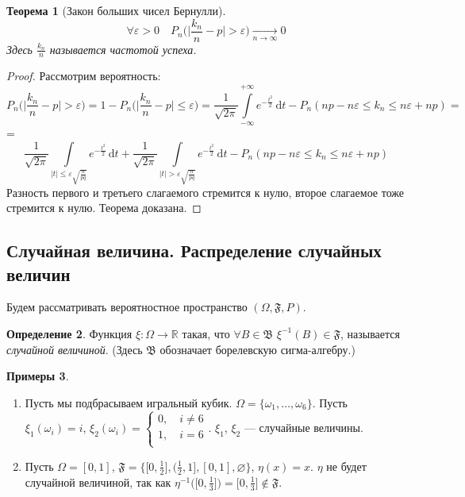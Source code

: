 \documentclass[11pt,openany,a4paper]{scrartcl}
\theoremstyle{plain}
\newtheorem{theorem}{Теорема}[subsection]
\theoremstyle{definition}
\newtheorem{definition}[theorem]{Определение}
\newtheorem{examples}[theorem]{Примеры}
\newcommand\mb{\mathbb}
\newcommand\real{\mb R}
\newcommand{\underto}[1]{\xrightarrow[#1]{}}
\newcommand{\dif}{\, \mathrm d}
\begin{document}
\begin{theorem}[Закон больших чисел Бернулли]\label{large_numbers_bernoulli}
    $$
    \forall \varepsilon > 0\quad P_n\bigg(\bigg|\frac{k_n}{n} -
    p\bigg| > \varepsilon\bigg)
    \underto{n \to \infty} 0
    $$
    Здесь $\frac{k_n}{n}$ называется частотой успеха.
\end{theorem}
\begin{proof}
    Рассмотрим вероятность:
    $$
    P_n\bigg(\bigg|\frac{k_n}{n} -
    p\bigg| > \varepsilon\bigg) = 1 - P_n\bigg(\bigg|\frac{k_n}{n} -
    p\bigg| \leqslant \varepsilon\bigg) =
    \frac{1}{\sqrt{2\pi}}
    \int\limits_{-\infty}^{+\infty}e^{-\frac{t^2}{2}} \dif t -
    P_n(np - n\varepsilon \leqslant k_n \leqslant n\varepsilon + np) =
    $$
    = $$
    \frac{1}{\sqrt{2\pi}}
    \int\limits_{|t|\leqslant \varepsilon \sqrt{\frac{n}{pq}}}
    e^{-\frac{t^2}{2}} \dif t + \frac{1}{\sqrt{2\pi}}
    \int\limits_{|t| > \varepsilon \sqrt{\frac{n}{pq}}}
    e^{-\frac{t^2}{2}} \dif t -
    P_n(np - n\varepsilon \leqslant k_n \leqslant n\varepsilon + np)
    $$
    Разность первого и третьего слагаемого стремится к нулю, второе слагаемое тоже
    стремится к нулю. Теорема доказана.
\end{proof}

\subsection{Случайная величина. Распределение случайных величин}

Будем рассматривать вероятностное пространство $(\Omega, \mathfrak{F}, P)$.

\begin{definition}
    Функция $\xi: \Omega \to \real$ такая, что
    $\forall B \in \mathfrak B$
    $\xi^{-1}(B) \in \mathfrak F$, называется \emph{случайной величиной}.
    (Здесь $\mathfrak B$ обозначает борелевскую сигма-алгебру.)
\end{definition}
\begin{examples}
    \begin{enumerate}
        \item Пусть мы подбрасываем игральный кубик.
        $\Omega = \{\omega_1,\ldots,\omega_6\}$. Пусть $\xi_1(\omega_i) = i$,
        $\xi_2(\omega_i) =
        \begin{cases}
            0,\quad i \neq 6\\
            1,\quad i = 6\\  
        \end{cases}
        $. $\xi_1$, $\xi_2$ — случайные величины.
        \item Пусть $\Omega = [0, 1]$,
        $\mathfrak F = \Big\{\big[0, \frac{1}{2}\big],
        \big(\frac{1}{2}, 1\big], [0, 1], \varnothing\Big\}$,
        $\eta(x) = x$. $\eta$ не будет случайной величиной, так как
        $\eta^{-1}\Big(\big[0, \frac{1}{3}\big]\Big) = \big[0, \frac{1}{3}\big] \notin \mathfrak F$.
    \end{enumerate}
\end{examples}
\end{document}
